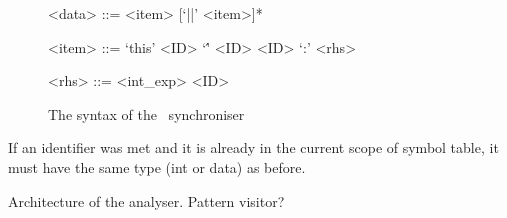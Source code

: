 \begin{itemize}
\begin{figure}
\begin{grammar}

<data> ::= <item> [`||' <item>]*

<item> ::= `this'
        \alt <ID>
        \alt `\'' <ID>
        \alt <ID> `:' <rhs>

<rhs> ::= <int\_exp>
          \alt <ID>

\end{grammar}
\caption{The syntax of the \ak\ synchroniser}
\end{figure}




If an identifier was met and it is already in the current scope of symbol table, it must have the same type (int or data) as before.
\end{itemize}

 Architecture of the analyser. Pattern visitor?


